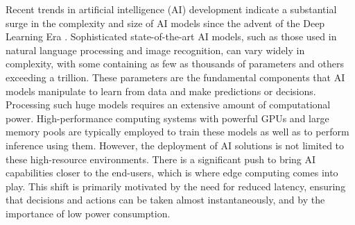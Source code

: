 Recent trends in artificial intelligence (AI) development indicate a substantial surge in the complexity and size of AI models since the advent of the Deep Learning Era \cite{EpochDatabaseVisualization}.
Sophisticated state-of-the-art AI models, such as those used in natural language processing and image recognition, can vary widely in complexity, with some containing as few as thousands of parameters and others exceeding a trillion.
These parameters are the fundamental components that AI models manipulate to learn from data and make predictions or decisions.
Processing such huge models requires an extensive amount of computational power.
High-performance computing systems with powerful GPUs and large memory pools are typically employed to train these models as well as to perform inference using them.
However, the deployment of AI solutions is not limited to these high-resource environments.
There is a significant push to bring AI capabilities closer to the end-users, which is where edge computing comes into play.
This shift is primarily motivated by the need for reduced latency, ensuring that decisions and actions can be taken almost instantaneously, and by the importance of low power consumption.


